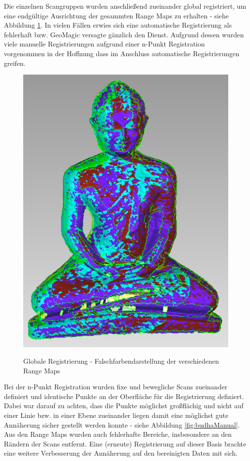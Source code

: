\documentclass[]{article}
\begin{document}
Die einzelnen Scangruppen wurden anschließend zueinander global registriert, um eine endgültige Ausrichtung der gesammten Range Maps zu erhalten - siehe Abbildung \ref{fig:budhaGlobal}. In vielen Fällen erwies sich eine automatische Registrierung als fehlerhaft bzw. GeoMagic versagte gänzlich den Dienst. Aufgrund dessen wurden viele manuelle Registrierungen aufgrund einer n-Punkt Registration vorgenommen in der Hoffnung dass im Anschluss automatische Registrierungen greifen.

\begin{figure}[H]
\centering
\caption{Globale Registrierung - Falschfarbendarstellung der verschiedenen Range Maps}
\includegraphics[scale=0.35]{images/GeoMagicBudhaPictures/Budha_Scans_Aufrecht_globalRegistration_2.PNG}
\label{fig:budhaGlobal}
\end{figure}

Bei der n-Punkt Registration wurden fixe und bewegliche Scans zueinander definiert und identische Punkte an der Oberfläche für die Registrierung definiert. Dabei war darauf zu achten, dass die Punkte möglichst großflächig und nicht auf einer Linie bzw. in einer Ebene zueinander liegen damit eine möglichst gute Annäherung sicher gestellt werden konnte - siehe Abbildung \ref{fig:budhaManual}. Aus den Range Maps wurden auch fehlerhafte Bereiche, insbesondere an den Rändern der Scans entfernt. Eine (erneute) Registrierung auf dieser Basis brachte eine weitere Verbesserung der Annäherung auf den bereinigten Daten mit sich.
\end{document}
